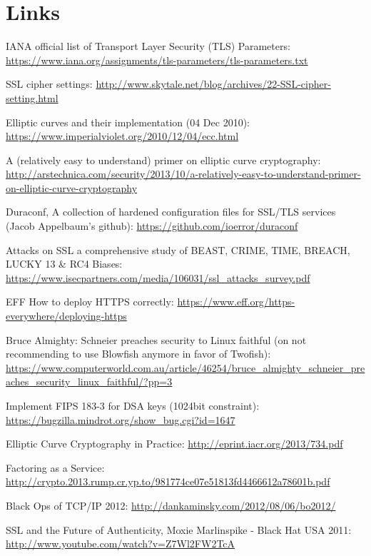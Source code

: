 \chapter{Links}
\label{cha:links}

\begin{itemize*}
  \item IANA official list of Transport Layer Security (TLS) Parameters: \url{https://www.iana.org/assignments/tls-parameters/tls-parameters.txt}
  \item SSL cipher settings: \url{http://www.skytale.net/blog/archives/22-SSL-cipher-setting.html}
  \item Elliptic curves and their implementation (04 Dec 2010): \url{https://www.imperialviolet.org/2010/12/04/ecc.html}
  \item A (relatively easy to understand) primer on elliptic curve cryptography: \url{http://arstechnica.com/security/2013/10/a-relatively-easy-to-understand-primer-on-elliptic-curve-cryptography}
  \item Duraconf, A collection of hardened configuration files for SSL/TLS services (Jacob Appelbaum's github): \url{https://github.com/ioerror/duraconf}
  \item Attacks on SSL a comprehensive study of BEAST, CRIME, TIME, BREACH, LUCKY 13 \& RC4 Biases: \url{https://www.isecpartners.com/media/106031/ssl_attacks_survey.pdf}
  \item EFF How to deploy HTTPS correctly: \url{https://www.eff.org/https-everywhere/deploying-https}
  \item Bruce Almighty: Schneier preaches security to Linux faithful (on not recommending to use Blowfish anymore in favor of Twofish): \url{https://www.computerworld.com.au/article/46254/bruce_almighty_schneier_preaches_security_linux_faithful/?pp=3}
  \item Implement FIPS 183-3 for DSA keys (1024bit constraint): \url{https://bugzilla.mindrot.org/show_bug.cgi?id=1647}
  \item Elliptic Curve Cryptography in Practice: \url{http://eprint.iacr.org/2013/734.pdf}
  \item Factoring as a Service: \url{http://crypto.2013.rump.cr.yp.to/981774ce07e51813fd4466612a78601b.pdf}
  \item Black Ops of TCP/IP 2012: \url{http://dankaminsky.com/2012/08/06/bo2012/}
  \item SSL and the Future of Authenticity, Moxie Marlinspike - Black Hat USA 2011: \url{http://www.youtube.com/watch?v=Z7Wl2FW2TcA}

\end{itemize*}
